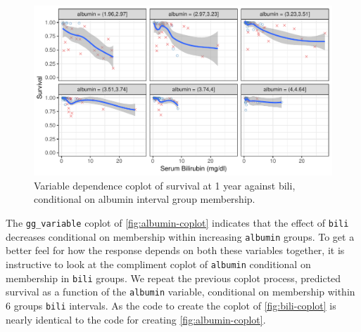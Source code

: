 \documentclass[article]{jss}
\begin{document}
\begin{Schunk}
\begin{figure}[!htb]

{\centering \includegraphics{rfs-albumin-coplot-1} 

}

\caption[Variable dependence coplot of survival at 1 year against bili, conditional on albumin interval group membership]{Variable dependence coplot of survival at 1 year against bili, conditional on albumin interval group membership.}\label{fig:albumin-coplot}
\end{figure}
\end{Schunk}

The \texttt{gg\_variable} coplot of \autoref{fig:albumin-coplot}
indicates that the effect of \texttt{bili} decreases conditional on
membership within increasing \texttt{albumin} groups. To get a better
feel for how the response depends on both these variables together, it
is instructive to look at the compliment coplot of \texttt{albumin}
conditional on membership in \texttt{bili} groups. We repeat the
previous coplot process, predicted survival as a function of the
\texttt{albumin} variable, conditional on membership within 6 groups
\texttt{bili} intervals. As the code to create the coplot of
\autoref{fig:bili-coplot} is nearly identical to the code for creating
\autoref{fig:albumin-coplot}.
\end{document}

